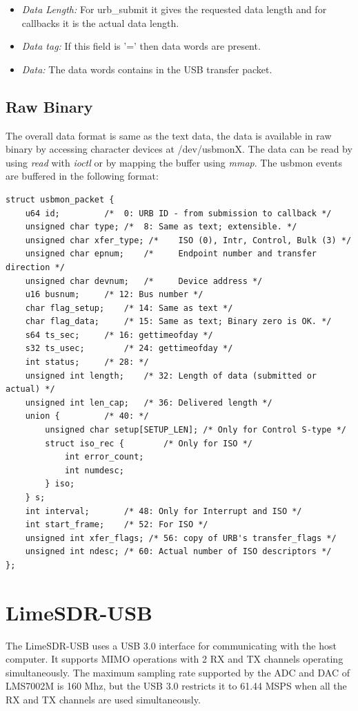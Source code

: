 \documentclass{kththesis}
\begin{document}
\begin{itemize}
\item{\textit{Data Length:} For urb\_submit it gives the requested data length and for callbacks it is the actual data length.}

\item{\textit{Data tag:} If this field is '=' then data words are present.}

\item{\textit{Data:} The data words contains in the USB transfer packet.}
\end{itemize}

\subsection{Raw Binary}
The overall data format is same as the text data, the data is available in raw binary by accessing character devices at /dev/usbmonX. The data can be read by using \textit{read} with \textit{ioctl} or by mapping the buffer using \textit{mmap}. The usbmon events are buffered in the following format:

\begingroup
\centering\scriptsize\begin{lstlisting}
struct usbmon_packet {
	u64 id;			/*  0: URB ID - from submission to callback */
	unsigned char type;	/*  8: Same as text; extensible. */
	unsigned char xfer_type; /*    ISO (0), Intr, Control, Bulk (3) */
	unsigned char epnum;	/*     Endpoint number and transfer direction */
	unsigned char devnum;	/*     Device address */
	u16 busnum;		/* 12: Bus number */
	char flag_setup;	/* 14: Same as text */
	char flag_data;		/* 15: Same as text; Binary zero is OK. */
	s64 ts_sec;		/* 16: gettimeofday */
	s32 ts_usec;		/* 24: gettimeofday */
	int status;		/* 28: */
	unsigned int length;	/* 32: Length of data (submitted or actual) */
	unsigned int len_cap;	/* 36: Delivered length */
	union {			/* 40: */
		unsigned char setup[SETUP_LEN];	/* Only for Control S-type */
		struct iso_rec {		/* Only for ISO */
			int error_count;
			int numdesc;
		} iso;
	} s;
	int interval;		/* 48: Only for Interrupt and ISO */
	int start_frame;	/* 52: For ISO */
	unsigned int xfer_flags; /* 56: copy of URB's transfer_flags */
	unsigned int ndesc;	/* 60: Actual number of ISO descriptors */
};	
\end{lstlisting}
\endgroup

\section{LimeSDR-USB}
The LimeSDR-USB uses a USB 3.0 interface for communicating with the host computer. It supports MIMO operations with 2 RX and TX channels operating simultaneously. The maximum sampling rate supported by the ADC and DAC of LMS7002M is 160 Mhz, but the USB 3.0 restricts it to 61.44 MSPS when all the RX and TX channels are used simultaneously.
\end{document}
